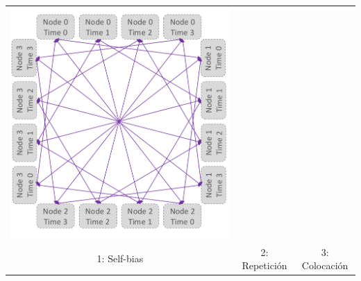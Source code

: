 \documentclass[11pt]{article}
\begin{document}
\begin{table}[H]
{\begin{tabular}{ccc}
			\includegraphics[scale=0.2]{figures/salesman-penalties3.png} \\
			
			1: Self-bias & 2: Repetición & 3: Colocación \\
			

\end{tabular}}
\end{table}
\end{document}
